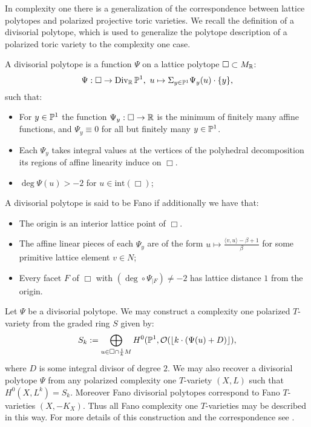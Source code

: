 In complexity one there is a generalization of the correspondence between lattice polytopes and polarized projective toric varieties. We recall the definition of a divisorial polytope, which is used to generalize the polytope description of a polarized toric variety to the complexity one case.
\begin{definition} \label{def:divpol}
A divisorial polytope is a function \(\Psi\) on a lattice polytope \(\Box \subset M_{\mathbb{R}}\):
\[
\Psi: \Box \to \operatorname{Div}_{\mathbb{R}} \mathbb{P}^1, \ u \mapsto \Sigma_{y \in \mathbb{P}^1} \Psi_y(u) \cdot \{y\},
\]
such that:
\begin{itemize}
\item For \(y \in \mathbb{P}^1\) the function \(\Psi_y: \Box \to \mathbb{R}\) is the minimum of finitely many  affine functions, and \(\Psi_y \equiv 0\) for all but finitely many \(y \in \mathbb{P}^1\).
\item Each \(\Psi_y\) takes integral values at the vertices of the polyhedral decomposition its regions of affine linearity induce on \(\Box\).
\item \(\deg \Psi(u) > -2\) for \(u \in \text{int} (\Box)\);
\end{itemize}
A divisorial polytope is said to be Fano if additionally we have that:
\begin{itemize}
\item The origin is an interior lattice point of \(\Box\).
\item The affine linear pieces of each  \(\Psi_y\) are of the form \(u \mapsto \frac{\langle v,u \rangle - \beta + 1}{\beta}\) for some primitive lattice element \(v \in N\);
\item Every facet \(F\) of \(\Box\) with \((\deg \circ \Psi _{|F}) \neq -2\) has lattice distance \(1\) from the origin.
\end{itemize}
\end{definition}
Let \(\Psi\) be a divisorial polytope. We may construct a complexity one polarized \(T\)-variety from the graded ring \(S\) given by: 
\[
S_k := \bigoplus_{u \in \Box \cap \frac{1}{k} M} H^0(\mathbb{P}^1, \mathcal{O}(\lfloor k \cdot ( \Psi(u) +D) \rfloor),
\]
where \(D\) is some integral divisor of degree \(2\). We may also recover a divisorial polytope \(\Psi\) from any polarized complexity one \(T\)-variety \((X,L)\) such that \( H^0(X,L^k) = S_k\). Moreover Fano divisorial polytopes correspond to Fano \(T\)-varieties \((X,-K_X)\). Thus all Fano complexity one \(T\)-varieties may be described in this way. For more details of this construction and the correspondence see \cite{suss2013fano}.

